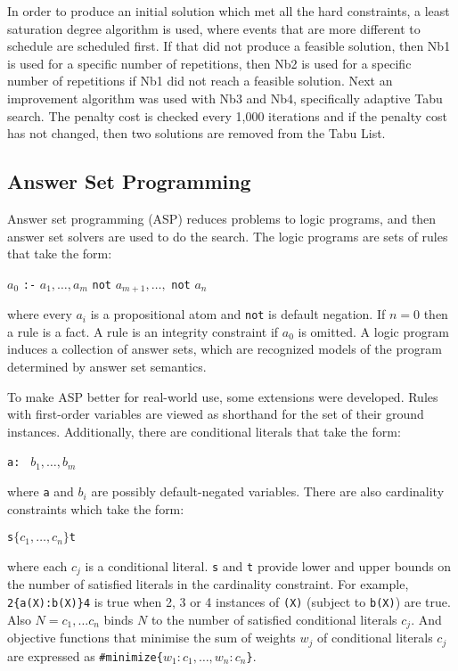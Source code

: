 \documentclass[a4paper, 12pt]{report}
\begin{document}
In order to produce an initial solution which met all the hard constraints, a
least saturation degree algorithm is used, where events that are more different
to schedule are scheduled first. If that did not produce a feasible solution,
then Nb1 is used for a specific number of repetitions, then Nb2 is used for a
specific number of repetitions if Nb1 did not reach a feasible solution. Next
an improvement algorithm was used with Nb3 and Nb4, specifically adaptive Tabu
search. The penalty cost is checked every 1,000 iterations and if the penalty
cost has not changed, then two solutions are removed from the Tabu List.

\subsection{Answer Set Programming}
Answer set programming (ASP) reduces problems to logic programs, and then
answer set solvers are used to do the search. The logic programs are sets of
rules that take the form:
\begin{center}
	$a_0$ \verb|:-| $a_1, \ldots, a_m$ \verb|not| $a_{m+1}, \ldots,$ \verb|not|
	$a_n$
\end{center}
where every $a_i$ is a propositional atom and \verb|not| is default negation. If $n=0$
then a rule is a fact. A rule is an integrity constraint if $a_0$ is omitted. A
logic program induces a collection of answer sets, which are recognized models
of the program determined by answer set semantics.

To make ASP better for real-world use, some extensions were developed. Rules
with first-order variables are viewed as shorthand for the set of their ground
instances. Additionally, there are conditional literals that take the form:
\begin{center}
	\verb|a: | $b_1, \ldots, b_m$
\end{center}
where \verb|a| and $b_i$ are possibly default-negated variables. There are also
cardinality constraints which take the form:
\begin{center}
	\verb|s|$\{c_1, \ldots, c_n\}$\verb|t|
\end{center}
where each $c_j$ is a conditional literal. \verb|s| and \verb|t| provide lower
and upper bounds on the number of satisfied literals in the cardinality
constraint. For example, \verb|2{a(X):b(X)}4| is true when 2, 3 or 4
instances of \verb|(X)| (subject to \verb|b(X)|) are true. Also $N=c_1,\ldots
c_n$ binds $N$ to the number of satisfied conditional literals $c_j$. And
objective functions that minimise the sum of weights $w_j$ of conditional
literals $c_j$ are expressed as
\verb|#minimize{|$w_1:c_1,\ldots, w_n:c_n$\verb|}|.
\end{document}
